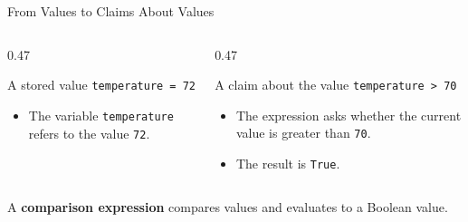 \documentclass[aspectratio=169,10pt]{beamer}
\begin{document}
\begin{frame}{From Values to Claims About Values}
  \begin{columns}[T,onlytextwidth]
    \begin{column}{0.47\textwidth}
      \begin{block}{A stored value}
        \centering
        \Large\texttt{temperature = 72}
      \end{block}

      \begin{itemize}
        \item The variable \texttt{temperature} refers to the value \texttt{72}.
      \end{itemize}
    \end{column}

    \begin{column}{0.47\textwidth}
      \begin{block}{A claim about the value}
        \centering
        \Large\texttt{temperature > 70}
      \end{block}

      \begin{itemize}
        \item The expression asks whether the current value is greater than \texttt{70}.
        \item The result is \texttt{True}.
      \end{itemize}
    \end{column}
  \end{columns}

  \begin{cpdefinition}
    A \textbf{comparison expression} compares values and evaluates to a Boolean value.
  \end{cpdefinition}
\end{frame}
\end{document}
